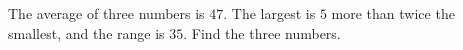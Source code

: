 The average of three numbers is $47$. The largest is $5$ more than twice the smallest, and the range is $35$. Find the three numbers.
